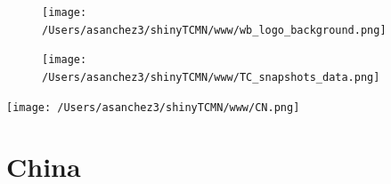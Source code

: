 \documentclass{article}\usepackage[]{graphicx}\usepackage[]{color}
\begin{document}
%

\begin{figure}
  \vspace{-3ex} %
  \hspace{-7ex} %
  \texttt{[image: /Users/asanchez3/shinyTCMN/www/wb\_logo\_background.png]}
\end{figure}
\begin{figure}
  \begin{minipage}[t]{0.99\textwidth} %
      \vspace{-30ex}
      \hspace{-2ex}
      \raggedright{\texttt{[image: /Users/asanchez3/shinyTCMN/www/TC\_snapshots\_data.png]}}
  \end{minipage}
\end{figure}
%
\begin{minipage}[t]{0.99\textwidth} %
  \vspace{-1.5cm}
  \begin{minipage}[c]{0.36\textwidth} 
    \begin{minipage}[c]{0.28\textwidth} %
      \texttt{[image: /Users/asanchez3/shinyTCMN/www/CN.png]}
    \end{minipage}
    \begin{minipage}[c]{0.70\textwidth} %
      \section*{\color{blue!40!black}China}
    \end{minipage}
  \end{minipage}
  \begin{minipage}[c]{0.63\textwidth} %
    \centering
  \end{minipage}  
\end{minipage} %
\end{document}
